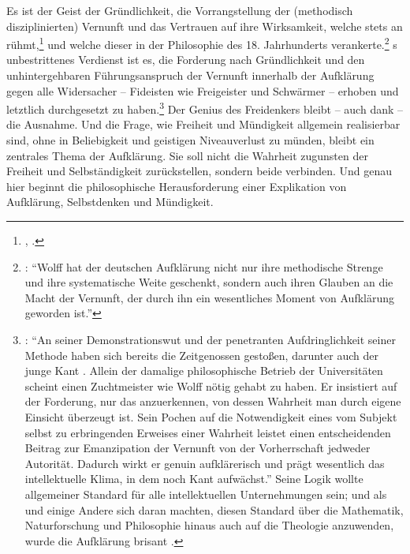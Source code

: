Es ist der Geist der Gründlichkeit, die Vorrangstellung der (methodisch
disziplinierten) Vernunft und das Vertrauen auf ihre Wirksamkeit, welche
 stets an 
rühmt,\footnote{\cite[Vgl.~z.\,B.][B~xxxv--xxxvii]{Kant:KritikderreinenVernunft2003},
\cite[][III: 21.24--22.23]{Kant:GesammelteWerke1900ff.}.} und welche dieser in
der Philosophie des {18.} Jahrhunderts
verankerte.\footnote{\cite[Vgl.][315]{Hinske:WolffsStellunginderdeutschenAufklaerung1986}:
\enquote{Wolff hat der deutschen Aufklärung nicht nur ihre methodische Strenge
und ihre systematische Weite geschenkt, sondern auch ihren Glauben an die Macht
der Vernunft, der durch ihn ein wesentliches Moment von Aufklärung geworden
ist.}} s unbestrittenes Verdienst ist
es, die Forderung nach Gründlichkeit und den unhintergehbaren Führungsanspruch
der Vernunft innerhalb der Aufklärung gegen
alle Widersacher -- Fideisten wie Freigeister und Schwärmer -- erhoben und
letztlich durchgesetzt zu
haben.\footnote{\cite[Vgl.][242]{Kreimendahl:ChristianWolff:EinleitendeAbhandlungueberPhilosophieimallgemeinen1994}:
\enquote{An seiner Demonstrationswut und der penetranten Aufdringlichkeit seiner
Methode haben sich bereits die Zeitgenossen gestoßen, darunter auch der junge
Kant \punkt . Allein der damalige philosophische Betrieb der Universitäten
scheint einen Zuchtmeister wie Wolff nötig gehabt zu haben. Er insistiert auf der
Forderung, nur das anzuerkennen, von dessen Wahrheit man durch eigene Einsicht
überzeugt ist. Sein Pochen auf die Notwendigkeit eines vom Subjekt selbst zu
erbringenden Erweises einer Wahrheit leistet einen entscheidenden Beitrag zur
Emanzipation der Vernunft von der Vorherrschaft jedweder Autorität. Dadurch
wirkt er genuin aufklärerisch und prägt wesentlich das intellektuelle Klima, in
dem noch Kant aufwächst.} Seine Logik wollte allgemeiner Standard für alle
intellektuellen Unternehmungen sein; und als  und einige Andere
sich daran machten, diesen Standard über die Mathematik, Naturforschung und
Philosophie hinaus auch auf die Theologie anzuwenden, wurde die Aufklärung
brisant \parencite[vgl.][\pno~xvii\,f.]{Gawlick:Einleitung2011}.}
Der Genius des Freidenkers bleibt -- auch dank  -- die Ausnahme. Und
die Frage, wie Freiheit und Mündigkeit allgemein realisierbar sind, ohne in Beliebigkeit und
geistigen Niveauverlust zu münden, bleibt ein zentrales Thema der Aufklärung.
Sie soll nicht die Wahrheit zugunsten der Freiheit und Selbständigkeit
zurückstellen, sondern beide verbinden. Und genau hier beginnt die
philosophische Herausforderung einer Explikation von Aufklärung, Selbstdenken
und Mündigkeit.

